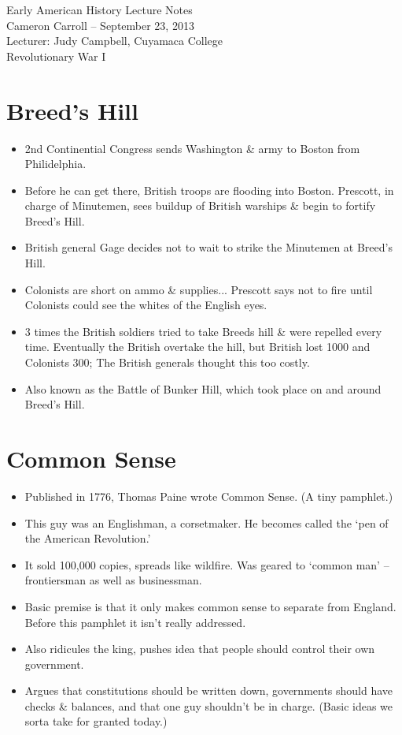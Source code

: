 \documentclass{article}
\begin{document}
  \begin{center}
    {\small{} Early American History Lecture Notes} \\[0.6cm]
    {\small{} Cameron Carroll -- September 23, 2013} \\[0.6cm]
    {\small{} Lecturer: Judy Campbell, Cuyamaca College}\\[1cm]
    {\small{} Revolutionary War I}\\[1cm]
  \end{center}
  
  \tableofcontents
  \newpage
  
  \section{Breed's Hill} 
    \begin{itemize}
      \item 2nd Continential Congress sends Washington \& army to Boston from Philidelphia.
      \item Before he can get there, British troops are flooding into Boston. Prescott, in charge of Minutemen, sees buildup of British warships \& begin to fortify Breed's Hill.
      \item British general Gage decides not to wait to strike the Minutemen at Breed's Hill.
      \item Colonists are short on ammo \& supplies... Prescott says not to fire until Colonists could see the whites of the English eyes.
      \item  3 times the British soldiers tried to take Breeds hill \& were repelled every time. Eventually the British overtake the hill, but British lost 1000 and Colonists 300; The British generals thought this too costly. 
      \item Also known as the Battle of Bunker Hill, which took place on and around Breed's Hill.
    \end{itemize}
 

  \section{Common Sense} 
    \begin{itemize}
      \item Published in 1776, Thomas Paine wrote Common Sense. (A tiny pamphlet.)
      \item This guy was an Englishman, a corsetmaker. He becomes called the `pen of the American Revolution.'
      \item It sold 100,000 copies, spreads like wildfire. Was geared to `common man' -- frontiersman as well as businessman.
      \item Basic premise is that it only makes common sense to separate from England. Before this pamphlet it isn't really addressed.
      \item Also ridicules the king, pushes idea that people should control their own government.
      \item Argues that constitutions should be written down, governments should have checks \& balances, and that one guy shouldn't be in charge. (Basic ideas we sorta take for granted today.)
    \end{itemize}
\end{document}
